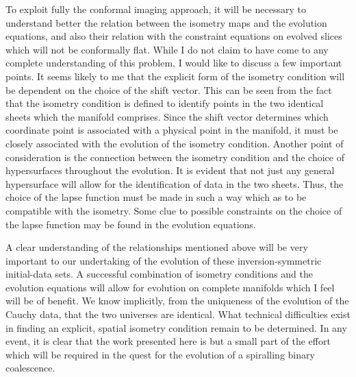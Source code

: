 To exploit fully the conformal imaging approach, it will be necessary to 
understand better the relation between the isometry maps and the evolution
equations, and also their relation with the constraint equations on evolved
slices which will not be conformally flat.  While I do not claim to have come to
any complete understanding of this problem, I would like to discuss a few
important points.  It seems likely to me that the explicit form of the isometry
condition will be dependent on the choice of the shift vector.  This can be seen
from the fact that the isometry condition is defined to identify points in the
two identical sheets which the manifold comprises.  Since the shift vector
determines which coordinate point is associated with a physical point in the
manifold, it must be closely associated with the evolution of the isometry
condition.  Another point of consideration is the connection between the
isometry condition and the choice of hypersurfaces throughout the evolution.  It
is evident that not just any general hypersurface will allow for the
identification of data in the two sheets.  Thus, the choice of the lapse
function must be made in such a way which as to be compatible with the
isometry.  Some clue to possible constraints on the choice of the lapse function
may be found in the evolution equations.

A clear understanding of the relationships mentioned above will be very
important to our undertaking of the evolution of these inversion-symmetric
initial-data sets.  A successful combination of isometry conditions and the
evolution equations will allow for evolution on complete manifolds which I feel
will be of benefit.  We know implicitly, from the uniqueness of the evolution
of the Cauchy data, that the two universes are identical.  What technical
difficulties exist in finding an explicit, spatial isometry condition remain to
be determined.  In any event, it is clear that the work presented here is but a
small part of the effort which will be required in the quest for the evolution
of a spiralling binary coalescence.


\vfill
\eject